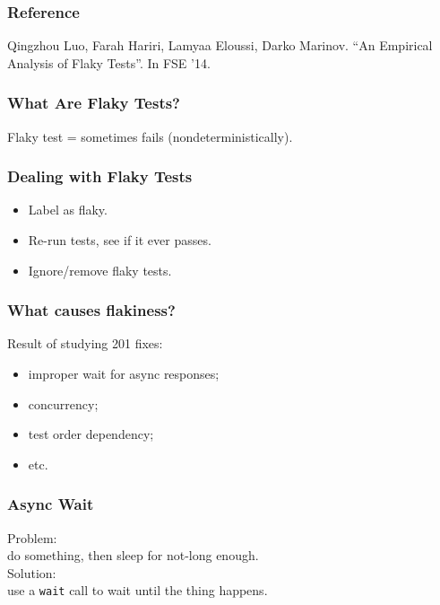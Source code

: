 \documentclass{beamer}
\newenvironment{changemargin}[1]{%
  \begin{list}{}{%
    \setlength{\topsep}{0pt}%
    \setlength{\leftmargin}{#1}%
    \setlength{\rightmargin}{1em}
    \setlength{\listparindent}{\parindent}%
    \setlength{\itemindent}{\parindent}%
    \setlength{\parsep}{\parskip}%
  }%
  \item[]}{\end{list}}
\begin{document}
\begin{frame}
  \frametitle{Reference}

  \begin{changemargin}{1cm}
    Qingzhou Luo, Farah Hariri, Lamyaa Eloussi, Darko Marinov. ``An Empirical Analysis of Flaky Tests''. In FSE '14.
  \end{changemargin}
\end{frame}

\begin{frame}
  \frametitle{What Are Flaky Tests?}
  \begin{changemargin}{1cm}
    \Large
    Flaky test = sometimes fails (nondeterministically).
  \end{changemargin}
\end{frame}

\begin{frame}
  \frametitle{Dealing with Flaky Tests}
  \begin{changemargin}{1cm}
    \Large
    \begin{itemize}
    \item Label as flaky.
    \item Re-run tests, see if it ever passes.
    \item Ignore/remove flaky tests.
    \end{itemize}
  \end{changemargin}
\end{frame}

\begin{frame}
  \frametitle{What causes flakiness?}
  \Large
  \begin{changemargin}{1cm}
    Result of studying 201 fixes:
    \begin{itemize}
    \item improper wait for async responses;
    \item concurrency;
    \item test order dependency;
    \item etc.
    \end{itemize}
  \end{changemargin}
\end{frame}

\begin{frame}
  \frametitle{Async Wait}
  \Large
  \begin{changemargin}{.6cm}
    Problem: \\
    \hspace*{1cm} do something, then sleep for not-long enough.\\
    Solution: \\
    \hspace*{1cm} use a {\tt wait} call to wait until the thing happens.
  \end{changemargin}
\end{frame}
\end{document}
